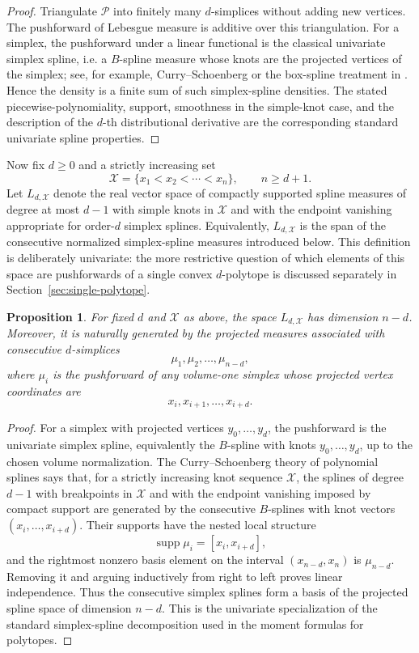 \documentclass[reqno]{amsart}
\numberwithin{theorem}{section}
\newtheorem{proposition}[theorem]{Proposition}
\newcommand{\cP}{\mathcal{P}}
\newcommand{\cX}{\mathcal{X}}
\begin{document}
\begin{proof}
Triangulate $\cP$ into finitely many $d$-simplices without adding new vertices. The pushforward of Lebesgue measure is additive over this triangulation. For a simplex, the pushforward under a linear functional is the classical univariate simplex spline, i.e. a $B$-spline measure whose knots are the projected vertices of the simplex; see, for example, Curry--Schoenberg \cite{CurrySchoenberg} or the box-spline treatment in \cite{DCP}. Hence the density is a finite sum of such simplex-spline densities. The stated piecewise-polynomiality, support, smoothness in the simple-knot case, and the description of the $d$-th distributional derivative are the corresponding standard univariate spline properties.
\end{proof}

Now fix $d\ge 0$ and a strictly increasing set
\[
\cX=\{x_1<x_2<\cdots<x_n\}, \qquad n\ge d+1.
\]
Let $L_{d,\cX}$ denote the real vector space of compactly supported spline measures of degree at most $d-1$ with simple knots in $\cX$ and with the endpoint vanishing appropriate for order-$d$ simplex splines.  Equivalently, $L_{d,\cX}$ is the span of the consecutive normalized simplex-spline measures introduced below.  This definition is deliberately univariate: the more restrictive question of which elements of this space are pushforwards of a single convex $d$-polytope is discussed separately in Section~\ref{sec:single-polytope}.

\begin{proposition}\label{prop:span}
For fixed $d$ and $\cX$ as above, the space $L_{d,\cX}$ has dimension $n-d$.
Moreover, it is naturally generated by the projected measures associated with consecutive $d$-simplices
\[
\mu_1,\mu_2,\dots,\mu_{n-d},
\]
where $\mu_i$ is the pushforward of any volume-one simplex whose projected vertex coordinates are
\[
x_i,x_{i+1},\dots,x_{i+d}.
\]
\end{proposition}

\begin{proof}
For a simplex with projected vertices $y_0,\dots,y_d$, the pushforward is the univariate simplex spline, equivalently the $B$-spline with knots $y_0,\dots,y_d$, up to the chosen volume normalization. The Curry--Schoenberg theory of polynomial splines \cite{CurrySchoenberg} says that, for a strictly increasing knot sequence $\cX$, the splines of degree $d-1$ with breakpoints in $\cX$ and with the endpoint vanishing imposed by compact support are generated by the consecutive $B$-splines with knot vectors $(x_i,\dots,x_{i+d})$. Their supports have the nested local structure
\[
\operatorname{supp}\mu_i=[x_i,x_{i+d}],
\]
and the rightmost nonzero basis element on the interval $(x_{n-d},x_n)$ is $\mu_{n-d}$. Removing it and arguing inductively from right to left proves linear independence. Thus the consecutive simplex splines form a basis of the projected spline space of dimension $n-d$. This is the univariate specialization of the standard simplex-spline decomposition used in the moment formulas for polytopes.
\end{proof}
\end{document}
